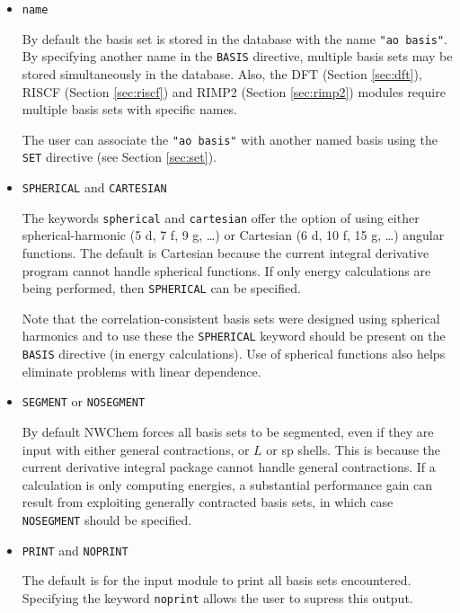 \begin{itemize}
\item {\tt name}

By default the basis set is stored in the database with the name
\verb+"ao basis"+.  By specifying another name in the \verb+BASIS+
directive, multiple basis sets may be stored simultaneously in the database.
Also, the DFT (Section \ref{sec:dft}), RISCF (Section \ref{sec:riscf})
and RIMP2 (Section \ref{sec:rimp2}) modules require multiple basis
sets with specific names.

The user can associate the \verb+"ao basis"+ with another named basis
using the \verb+SET+ directive (see Section \ref{sec:set}).  

\item {{\tt SPHERICAL} and {\tt CARTESIAN}}

The keywords \verb+spherical+ and \verb+cartesian+ offer the option of
using either spherical-harmonic (5 d, 7 f, 9 g, \ldots) or Cartesian
(6 d, 10 f, 15 g, \ldots) angular functions.  The default is
Cartesian because the current integral derivative program cannot
handle spherical functions.  If only energy calculations are being
performed, then {\tt SPHERICAL} can be specified.  

Note that the correlation-consistent basis sets were designed using
spherical harmonics and to use these the \verb+SPHERICAL+ keyword
should be present on the \verb+BASIS+ directive (in energy
calculations).  Use of spherical functions also helps eliminate
problems with linear dependence.


\item {{\tt SEGMENT} or {\tt NOSEGMENT}}

By default NWChem forces all basis sets to be segmented, 
even if they are input with either general contractions, or $L$ or sp
shells. This is because the current derivative integral package cannot
handle general contractions.  If a calculation is only 
computing energies, a substantial
performance gain can result from exploiting generally contracted basis
sets, in which case {\tt NOSEGMENT} should be specified.

\item {{\tt PRINT} and {\tt NOPRINT}}

The default is for the input module to print all basis sets encountered.
Specifying the keyword \verb+noprint+ allows the user to supress this output.

\end{itemize}

